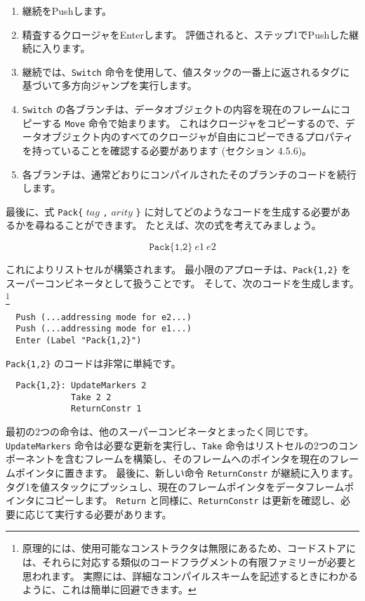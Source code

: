 \documentclass{jarticle}
\begin{document}
\begin{enumerate}
	\item 継続をPushします。
	\item 精査するクロージャをEnterします。
	      評価されると、ステップ1でPushした継続に入ります。
	\item 継続では、\texttt{Switch} 命令を使用して、値スタックの一番上に返されるタグに基づいて多方向ジャンプを実行します。
	\item \texttt{Switch} の各ブランチは、データオブジェクトの内容を現在のフレームにコピーする \texttt{Move} 命令で始まります。
	      これはクロージャをコピーするので、データオブジェクト内のすべてのクロージャが自由にコピーできるプロパティを持っていることを確認する必要があります (セクション 4.5.6)。
	\item 各ブランチは、通常どおりにコンパイルされたそのブランチのコードを続行します。
\end{enumerate}

最後に、式 \texttt{Pack\{} $tag$ \texttt{,} $arity$ \texttt{\}} に対してどのようなコードを生成する必要があるかを尋ねることができます。
たとえば、次の式を考えてみましょう。

\[\texttt{Pack\{1,2\}} ~ e1 ~ e2\]

これによりリストセルが構築されます。
最小限のアプローチは、\texttt{Pack\{1,2\}} をスーパーコンビネータとして扱うことです。
そして、次のコードを生成します。
\footnote{原理的には、使用可能なコンストラクタは無限にあるため、コードストアには、それらに対応する類似のコードフラグメントの有限ファミリーが必要と思われます。
	実際には、詳細なコンパイルスキームを記述するときにわかるように、これは簡単に回避できます。}

\begin{verbatim}
  Push (...addressing mode for e2...)
  Push (...addressing mode for e1...)
  Enter (Label "Pack{1,2}")
\end{verbatim}

\texttt{Pack\{1,2\}} のコードは非常に単純です。

\begin{verbatim}
  Pack{1,2}: UpdateMarkers 2
             Take 2 2
             ReturnConstr 1
\end{verbatim}

最初の2つの命令は、他のスーパーコンビネータとまったく同じです。
\texttt{UpdateMarkers} 命令は必要な更新を実行し、\texttt{Take} 命令はリストセルの2つのコンポーネントを含むフレームを構築し、そのフレームへのポインタを現在のフレームポインタに置きます。
最後に、新しい命令 \texttt{ReturnConstr} が継続に入ります。
タグ1を値スタックにプッシュし、現在のフレームポインタをデータフレームポインタにコピーします。
\texttt{Return} と同様に、\texttt{ReturnConstr} は更新を確認し、必要に応じて実行する必要があります。
\end{document}

